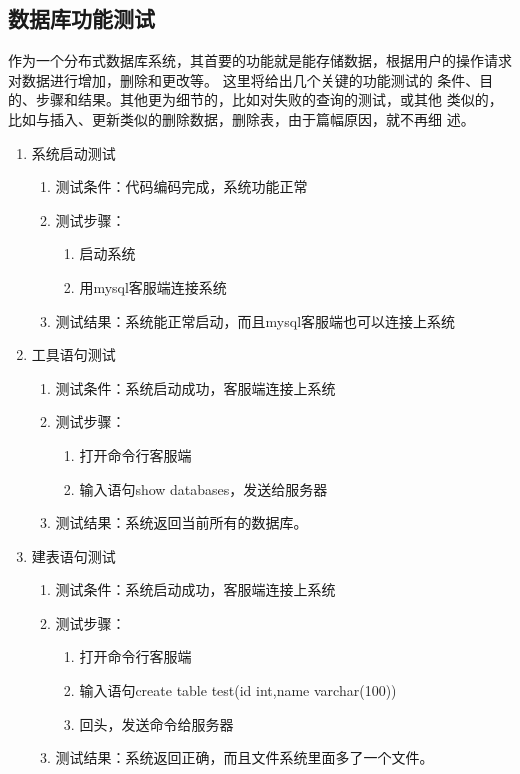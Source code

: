 \subsection{数据库功能测试}
作为一个分布式数据库系统，其首要的功能就是能存储数据，根据用户的操作请求对数据进行增加，删除和更改等。
这里将给出几个关键的功能测试的
条件、目的、步骤和结果。其他更为细节的，比如对失败的查询的测试，或其他
类似的，比如与插入、更新类似的删除数据，删除表，由于篇幅原因，就不再细
述。
\begin{enumerate}

	\item 系统启动测试
	\begin{enumerate}
		\item 测试条件：代码编码完成，系统功能正常
		\item 测试步骤：
		\begin{enumerate}
			\item 启动系统
			\item 用mysql客服端连接系统
		\end{enumerate}
	\item 	测试结果：系统能正常启动，而且mysql客服端也可以连接上系统
	\end{enumerate}



\item 工具语句测试
\begin{enumerate}
	\item 测试条件：系统启动成功，客服端连接上系统
	\item 测试步骤：
	\begin{enumerate}
		\item 打开命令行客服端
		\item 输入语句show databases，发送给服务器
	\end{enumerate}
	\item 	测试结果：系统返回当前所有的数据库。
\end{enumerate}	


\item 建表语句测试
\begin{enumerate}
	\item 测试条件：系统启动成功，客服端连接上系统
	\item 测试步骤：
	\begin{enumerate}
		\item 打开命令行客服端
		\item 输入语句create table test(id int,name	varchar(100))
		\item 回头，发送命令给服务器
	\end{enumerate}
	\item 	测试结果：系统返回正确，而且文件系统里面多了一个文件。
\end{enumerate}	



\end{enumerate}
